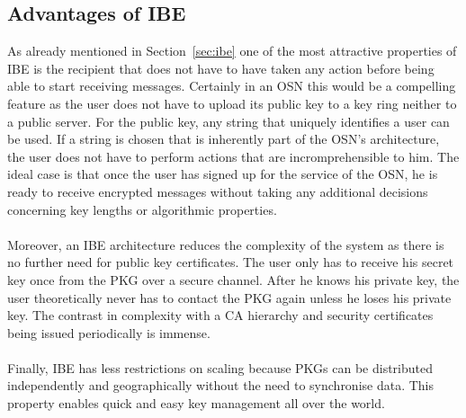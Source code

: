 \documentclass[journal]{IEEEtran}
\begin{document}
\subsection{Advantages of IBE}
As already mentioned in Section~\ref{sec:ibe} one of the most attractive
properties of IBE is the recipient that does not have to have taken any action
before being able to start receiving messages. Certainly in an OSN this would
be a compelling feature as the user does not have to upload its public key to a
key ring neither to a public server. For the public key, any string
that uniquely identifies a user can be used. If a string is chosen that is
inherently part of the OSN's architecture, the user does not have to perform
actions that are incromprehensible to him. The ideal case is that once the
user has signed up for the service of the OSN, he is ready to receive encrypted
messages without taking any additional decisions concerning key lengths or
algorithmic properties.\\
\\
Moreover, an IBE architecture reduces the complexity of the system as there is
no further need for public key certificates. The user only has to receive his
secret key once from the PKG over a secure channel. After he knows his private
key, the user theoretically never has to contact the PKG again unless he loses
his private key. The contrast in complexity with a CA hierarchy and security
certificates being issued periodically is immense.\\
\\
Finally, IBE has less restrictions on scaling because PKGs can be distributed
independently and geographically without the need to synchronise data. This
property enables quick and easy key management all over the
world.~\cite{VoltageIBE}
\end{document}
